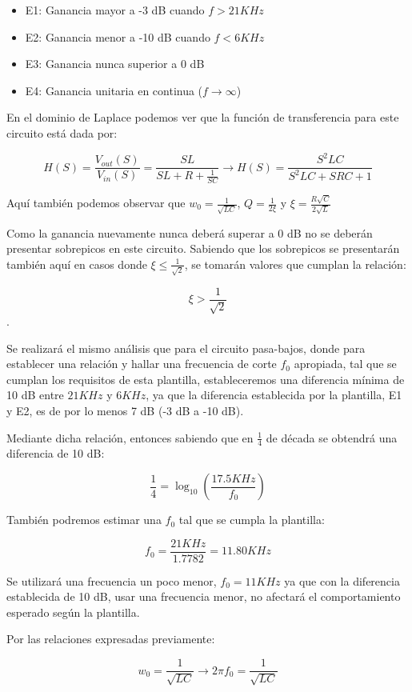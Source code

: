 \begin{itemize}
	\item E1: Ganancia mayor a -3 dB cuando $f > 21 KHz$ 
	\item E2: Ganancia menor a -10 dB cuando $f < 6 KHz $
	\item E3: Ganancia nunca superior a 0 dB
	\item E4: Ganancia unitaria en continua ($f \to \infty$)
\end{itemize}

En el dominio de Laplace podemos ver que la función de transferencia para este circuito está dada por:

$$H(S)=\frac{V_{out}(S)}{V_{in}(S)}=\frac{SL}{SL+R+\frac{1}{SC}} \longrightarrow H(S)=\frac{S^{2}LC}{S^2LC+SRC+1}$$

Aquí también podemos observar que $w_0=\frac{1}{\sqrt{LC}}$, $Q=\frac{1}{2\xi}$ y $\xi=\frac{R\sqrt{C}}{2\sqrt{L}}$

Como la ganancia nuevamente nunca deberá superar a 0 dB no se deberán presentar sobrepicos en este circuito.
Sabiendo que los sobrepicos se presentarán también aquí en casos donde $\xi \leq \frac{1}{\sqrt{2}}$, se tomarán valores que cumplan la relación:

$$\xi > \frac{1}{\sqrt{2}}$$.

Se realizará el mismo análisis que para el circuito pasa-bajos, donde para establecer una relación y hallar una frecuencia de corte $f_0$ apropiada, tal que se cumplan los requisitos
de esta plantilla, estableceremos una diferencia mínima de 10 dB entre $21 KHz$ y $6 KHz$, ya que la diferencia establecida por la plantilla, E1 y E2,
es de por lo menos 7 dB (-3 dB a -10 dB).

Mediante dicha relación, entonces sabiendo que en $\frac{1}{4}$ de década se obtendrá una diferencia de 10 dB:

$$\frac{1}{4}=\log_{10}(\frac{17.5KHz}{f_0})$$

También podremos estimar una $f_0$ tal que se cumpla la plantilla:

$$f_0 = \frac{21KHz}{1.7782} = 11.80 KHz$$

Se utilizará una frecuencia un poco menor, $f_0=11 KHz$ ya que con la diferencia establecida de 10 dB, usar una frecuencia menor, no afectará el comportamiento 
esperado según la plantilla.

Por las relaciones expresadas previamente:

$$w_0=\frac{1}{\sqrt{LC}} \longrightarrow 2\pi f_0=\frac{1}{\sqrt{LC}}$$

